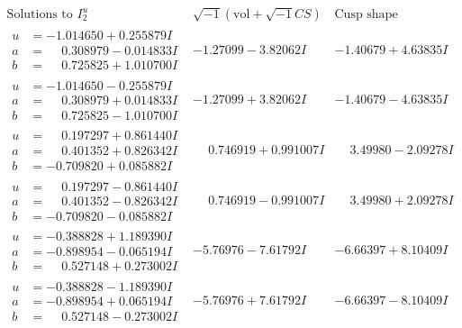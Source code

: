 \documentclass[1p]{elsarticle_modified}
\theoremstyle{definition}
\newcommand{\I}{\sqrt{-1}}
\begin{document}
$$\begin{array}{c|c|c}  
\text{Solutions to }I^u_{2}& \I (\text{vol} + \sqrt{-1}CS) & \text{Cusp shape}\\
 \hline 
\begin{aligned}
u &= -1.014650 + 0.255879 I \\
a &= \phantom{-}0.308979 - 0.014833 I \\
b &= \phantom{-}0.725825 + 1.010700 I\end{aligned}
 & -1.27099 - 3.82062 I & -1.40679 + 4.63835 I \\ \hline\begin{aligned}
u &= -1.014650 - 0.255879 I \\
a &= \phantom{-}0.308979 + 0.014833 I \\
b &= \phantom{-}0.725825 - 1.010700 I\end{aligned}
 & -1.27099 + 3.82062 I & -1.40679 - 4.63835 I \\ \hline\begin{aligned}
u &= \phantom{-}0.197297 + 0.861440 I \\
a &= \phantom{-}0.401352 + 0.826342 I \\
b &= -0.709820 + 0.085882 I\end{aligned}
 & \phantom{-}0.746919 + 0.991007 I & \phantom{-}3.49980 - 2.09278 I \\ \hline\begin{aligned}
u &= \phantom{-}0.197297 - 0.861440 I \\
a &= \phantom{-}0.401352 - 0.826342 I \\
b &= -0.709820 - 0.085882 I\end{aligned}
 & \phantom{-}0.746919 - 0.991007 I & \phantom{-}3.49980 + 2.09278 I \\ \hline\begin{aligned}
u &= -0.388828 + 1.189390 I \\
a &= -0.898954 - 0.065194 I \\
b &= \phantom{-}0.527148 + 0.273002 I\end{aligned}
 & -5.76976 - 7.61792 I & -6.66397 + 8.10409 I \\ \hline\begin{aligned}
u &= -0.388828 - 1.189390 I \\
a &= -0.898954 + 0.065194 I \\
b &= \phantom{-}0.527148 - 0.273002 I\end{aligned}
 & -5.76976 + 7.61792 I & -6.66397 - 8.10409 I \\ \hline\begin{aligned}

\end{aligned}
\end{array}$$
\end{document}
